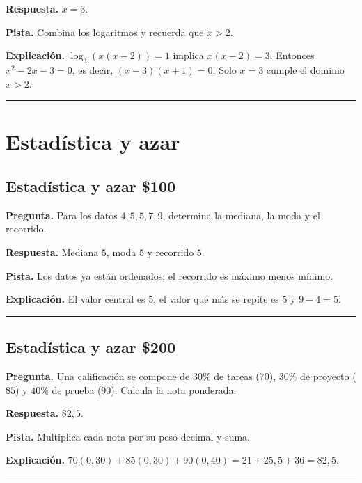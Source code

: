 \documentclass[11pt,letterpaper]{article}
\begin{document}
\textbf{Respuesta.} $x=3$.

\textbf{Pista.} Combina los logaritmos y recuerda que $x>2$.

\textbf{Explicación.} $\log_3(x(x-2))=1$ implica $x(x-2)=3$. Entonces $x^2-2x-3=0$, es decir, $(x-3)(x+1)=0$. Solo $x=3$ cumple el dominio $x>2$.


\vspace{0.8em}
\hrule
\vspace{1.1em}



\clearpage
\section*{Estadística y azar}

\subsection*{\textcolor{DeepBlue}{Estadística y azar} \hfill \$100}
\textbf{Pregunta.} Para los datos $4,5,5,7,9$, determina la mediana, la moda y el recorrido.


\textbf{Respuesta.} Mediana $5$, moda $5$ y recorrido $5$.

\textbf{Pista.} Los datos ya están ordenados; el recorrido es máximo menos mínimo.

\textbf{Explicación.} El valor central es $5$, el valor que más se repite es $5$ y $9-4=5$.


\vspace{0.8em}
\hrule
\vspace{1.1em}


\subsection*{\textcolor{DeepBlue}{Estadística y azar} \hfill \$200}
\textbf{Pregunta.} Una calificación se compone de $30\%$ de tareas ($70$), $30\%$ de proyecto ($85$) y $40\%$ de prueba ($90$). Calcula la nota ponderada.


\textbf{Respuesta.} $82{,}5$.

\textbf{Pista.} Multiplica cada nota por su peso decimal y suma.

\textbf{Explicación.} $70(0{,}30)+85(0{,}30)+90(0{,}40)=21+25{,}5+36=82{,}5$.


\vspace{0.8em}
\hrule
\vspace{1.1em}
\end{document}
